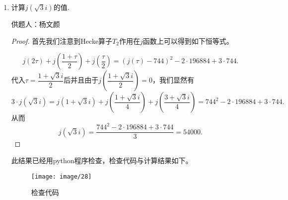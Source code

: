 \documentclass[lang=cn,12pt,a4paper]{elegantpaper}
\begin{document}
\begin{enumerate}
\begin{proof}
\begin{lemma}
\begin{enumerate}
				那么

				\[ \sum_{a < n \leq b} e^{2 \pi i f(n)} \ll N \lambda^{1/2} + \lambda^{-1/2}.\]
				\item
				令$a,b \in \mathbb{R}, a<b, f \in C^{3}([a,b]), b-a=N$，且
				\[ |f'''(t)| \asymp \lambda >0 \quad (a<t<b),\]

				那么

				\[ \sum_{a < n \leq b} e^{2 \pi i f(n)} \ll N \lambda^{1/6} + N^{1/2} \lambda^{-1/6}.\]
			\end{enumerate}
		\end{lemma}
		取$f(n)=-(\tau/2\pi) \log t$可以得到估计
		\[ \sum_{a < n \leq b} n^{-i \tau} \ll \min(\tau^{1/2}+a\tau^{-1/2}, a^{1/2}\tau^{1/6}+a\tau^{-1/6}).\]
		对$\tau>0, a < b \leq 2a$一致成立，因此显然有
		\begin{align*}
			\sum_{a < n \leq b} n^{-1/2-i \tau} &\ll \min ((\tau/a)^{1/2}+(a/\tau)^{1/2}, \tau^{1/6}+a^{1/2}\tau^{-1/6})\\
			&\ll \min (\tau^{1/6}, (\tau/a)^{1/2}).
		\end{align*}
		对于$r \leq \log x/ \log 2$, 选择$a=2^r, b=\min (2^{r+1}, x)$并将上述估计相加, 得
		\[ \sum_{n \leq x} n^{-1/2-i \tau} \ll \tau^{1/6} \log \tau \quad(x \ll \tau)\]
		代入$x=\tau$即可得到上述估计.
	\end{proof}
		
	\item 计算$j(\sqrt{3} i)$的值.
	\begin{flushright}
		\kaishu
		供题人：杨文颜
	\end{flushright}

	\begin{proof}
		首先我们注意到Hecke算子$T_2$作用在$j$函数上可以得到如下恒等式。

		\[ j(2\tau)+j(\dfrac{1+\tau}{2})+j(\dfrac{\tau}{2})= (j(\tau)-744)^2-2\cdot 196884+ 3\cdot 744.\]
		代入$\tau= \dfrac{1+\sqrt{3}i}{2}$后并且由于$j(\dfrac{1+\sqrt{3}i}{2})=0$，我们显然有
		\[ 3 \cdot j(\sqrt{3}i)=j(1+\sqrt{3}i)+j(\dfrac{1+\sqrt{3}i}{4})+j(\dfrac{3+\sqrt{3}i}{4})=744^2-2\cdot 196884+3\cdot 744.\]
		从而
		\[ j(\sqrt{3}i)=\dfrac{744^2-2\cdot 196884+3\cdot 744}{3}=54000.\]
	\end{proof}

	此结果已经用python程序检查，检查代码与计算结果如下。

	\begin{figure}[ht]
		\centering
		\texttt{[image: image/28]}
		\caption{检查代码}
	\end{figure}


\end{enumerate}
\end{document}
